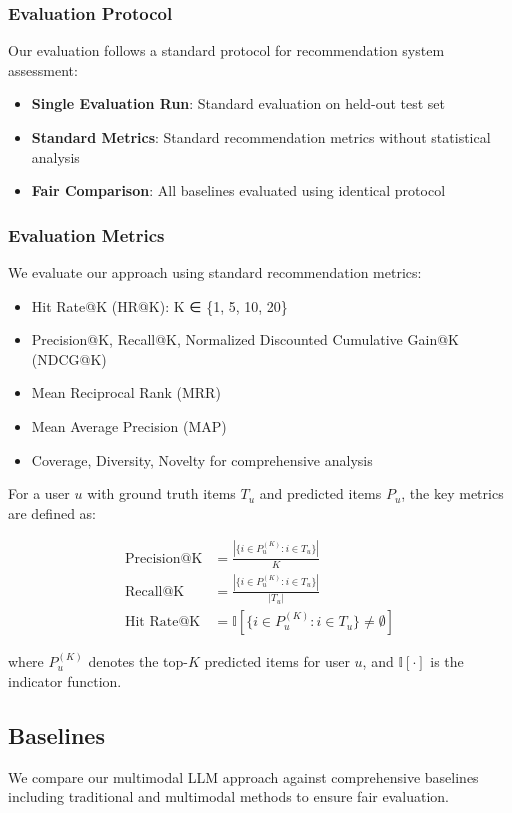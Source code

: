 \documentclass[conference]{IEEEtran}
\begin{document}
\subsubsection{Evaluation Protocol}
Our evaluation follows a standard protocol for recommendation system assessment:
\begin{itemize}
    \item \textbf{Single Evaluation Run}: Standard evaluation on held-out test set
    \item \textbf{Standard Metrics}: Standard recommendation metrics without statistical analysis
    \item \textbf{Fair Comparison}: All baselines evaluated using identical protocol
\end{itemize}

\subsubsection{Evaluation Metrics}
We evaluate our approach using standard recommendation metrics:
\begin{itemize}
    \item Hit Rate@K (HR@K): K ∈ \{1, 5, 10, 20\}
    \item Precision@K, Recall@K, Normalized Discounted Cumulative Gain@K (NDCG@K)
    \item Mean Reciprocal Rank (MRR)
    \item Mean Average Precision (MAP)
    \item Coverage, Diversity, Novelty for comprehensive analysis
\end{itemize}

For a user $u$ with ground truth items $T_u$ and predicted items $P_u$, the key metrics are defined as:

\begin{align}
\text{Precision@K} &= \frac{|\{i \in P_u^{(K)} : i \in T_u\}|}{K} \\
\text{Recall@K} &= \frac{|\{i \in P_u^{(K)} : i \in T_u\}|}{|T_u|} \\
\text{Hit Rate@K} &= \mathbb{I}[\{i \in P_u^{(K)} : i \in T_u\} \neq \emptyset]
\end{align}

where $P_u^{(K)}$ denotes the top-$K$ predicted items for user $u$, and $\mathbb{I}[\cdot]$ is the indicator function.

\subsection{Baselines}
We compare our multimodal LLM approach against comprehensive baselines including traditional and multimodal methods to ensure fair evaluation.
\end{document}
